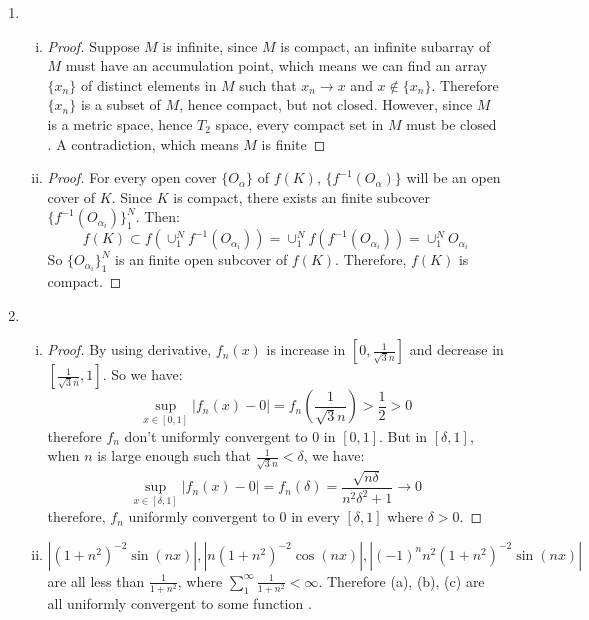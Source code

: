 \documentclass[11pt]{article}
\begin{document}
\begin{enumerate}[1]
\begin{enumerate}[(i)]
\begin{proof}
		\end{proof}
		\item
		\begin{enumerate}[(a)]
			\item $(0,1+\frac{1}{n})$ are open but $\cap_{n=1}^\infty (0, 1 + \frac{1}{n}) = (0 , 1]$ is not open.
			\item $\{(x,x^2): x \in [0,1]\} \cap \{(x,x): x \in [0,1]\} = \{(0,0),(1,1)\}$ is not connected. 
		\end{enumerate}
	\end{enumerate}
	\item
	\begin{enumerate}[(i)]
		\item 
		\begin{proof}
			Suppose $M$ is infinite, since $M$ is compact, an infinite subarray of $M$ must have an accumulation point, which means we can find an array $\{x_n\}$ of distinct elements in $M$
			such that $x_n \to x$ and $x \notin \{x_n\}$. Therefore $\{x_n\}$ is a subset of $M$, hence compact, but not closed. However, since $M$ is a metric space, hence $T_2$ space, every compact set in $M$ must be closed \cite{topology}. A contradiction, which means $M$ is finite
		\end{proof}
		\item 
		\begin{proof}
			For every open cover $\{O_\alpha\}$ of $f(K)$, $\{f^{-1}(O_\alpha)\}$ will be an open
			cover of $K$. Since $K$ is compact, there exists an finite subcover $\{f^{-1}(O_{\alpha_i})\}_1^N$. Then:
			$$f(K) \subset f\left( \cup_1^N f^{-1}(O_{\alpha_i}) \right) = \cup_1^N f(f^{-1}(O_{\alpha_i})) = \cup_1^N O_{\alpha_i}$$
			So $\{O_{\alpha_i}\}_1^N$ is an finite open subcover of $f(K)$. Therefore, $f(K)$ is compact.
		\end{proof}
	\end{enumerate}
	\item 
	\begin{enumerate}[(i)]
		\item
		\begin{proof}
			By using derivative, $f_n(x)$ is increase in $[0, \frac{1}{\sqrt{3} n}]$ and decrease in
			$[\frac{1}{\sqrt{3} n}, 1]$. So we have:
			$$\sup_{x\in[0,1]} |f_n(x) - 0| = f_n(\frac{1}{\sqrt{3} n}) > \frac{1}{2} > 0$$
			therefore $f_n$ don't uniformly convergent to $0$ in $[0,1]$. But in $[\delta,1]$, when $n$ is large enough such that $\frac{1}{\sqrt{3} n} < \delta$, we have:
			$$\sup_{x\in[\delta,1]} |f_n(x) - 0| = f_n(\delta) = \frac{\sqrt{n \delta}}{n^2 \delta^2 + 1} \to 0$$ 
			therefore, $f_n$ uniformly convergent to $0$ in every $[\delta, 1]$ where $\delta > 0$.
		\end{proof}
		\item
		$|(1+n^2)^{-2} \sin(n x)|, |n (1+n^2)^{-2} \cos(n x)|, |(-1)^n n^2 (1+n^2)^{-2} \sin(n x)|$
		are all less than $\frac{1}{1 + n^2}$, where $\sum_1^\infty \frac{1}{1 + n^2} < \infty$. Therefore (a), (b), (c) are all uniformly convergent to some function \cite{wei}.
		

\end{enumerate}
\end{enumerate}
\end{document}
